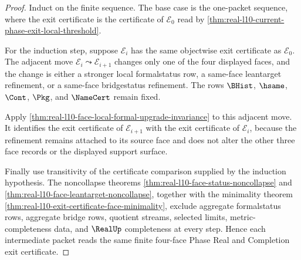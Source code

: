 \begin{proof}
Induct on the finite sequence. The base case is the one-packet sequence, where the exit certificate is the certificate of $\mathcal E_0$ read by \autoref{thm:real-l10-current-phase-exit-local-threshold}.

For the induction step, suppose $\mathcal E_i$ has the same objectwise exit certificate as $\mathcal E_0$. The adjacent move $\mathcal E_i\leadsto\mathcal E_{i+1}$ changes only one of the four displayed faces, and the change is either a stronger local formalstatus row, a same-face leantarget refinement, or a same-face bridgestatus refinement. The rows $\BHist$, $\hsame$, $\Cont$, $\Pkg$, and $\NameCert$ remain fixed.

Apply \autoref{thm:real-l10-face-local-formal-upgrade-invariance} to this adjacent move. It identifies the exit certificate of $\mathcal E_{i+1}$ with the exit certificate of $\mathcal E_i$, because the refinement remains attached to its source face and does not alter the other three face records or the displayed support surface.

Finally use transitivity of the certificate comparison supplied by the induction hypothesis. The noncollapse theorems \autoref{thm:real-l10-face-status-noncollapse} and \autoref{thm:real-l10-face-leantarget-noncollapse}, together with the minimality theorem \autoref{thm:real-l10-exit-certificate-face-minimality}, exclude aggregate formalstatus rows, aggregate bridge rows, quotient streams, selected limits, metric-completeness data, and $\RealUp$ completeness at every step. Hence each intermediate packet reads the same finite four-face Phase Real and Completion exit certificate.
\end{proof}

